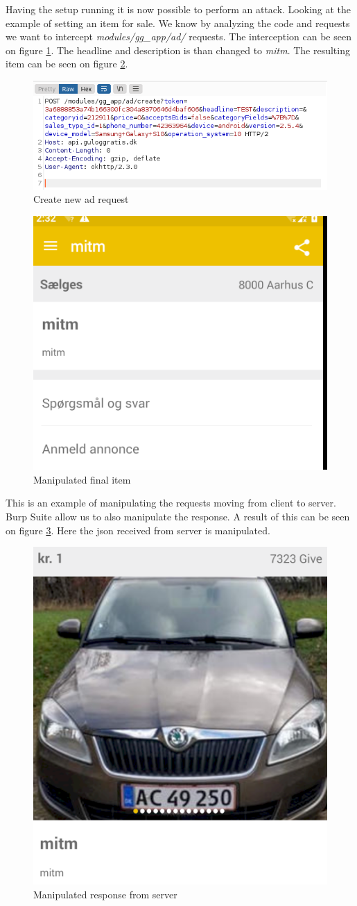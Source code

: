 Having the setup running it is now possible to perform an attack. Looking at the example of setting an item for sale. We know by analyzing the code and requests we want to intercept \textit{modules/gg\_app/ad/} requests. The interception can be seen on figure \ref{fig:attack-new-ad}. The headline and description is than changed to \textit{mitm}. The resulting item can be seen on figure \ref{fig:attack-final-ad}.  

\begin{figure}[htbp]
    \centering
    \includegraphics[width=0.5\columnwidth]{../dynamic-analysis/pictures/MITM-auction-burp.png}
    \caption{Create new ad request}
    \label{fig:attack-new-ad}
\end{figure}

\begin{figure}[htbp]
    \centering
    \includegraphics[width=0.5\columnwidth]{../dynamic-analysis/pictures/mitm_auction.png}
    \caption{Manipulated final item}
    \label{fig:attack-final-ad}
\end{figure}

This is an example of manipulating the requests moving from client to server. Burp Suite allow us to also manipulate the response. A result of this can be seen on figure \ref{fig:server-client-mitm}. Here the json received from server is manipulated.  

\begin{figure}[htbp]
    \centering
    \includegraphics[width=0.5\columnwidth]{../dynamic-analysis/pictures/server-client-mitm.png}
    \caption{Manipulated response from server}
    \label{fig:server-client-mitm}
\end{figure}

